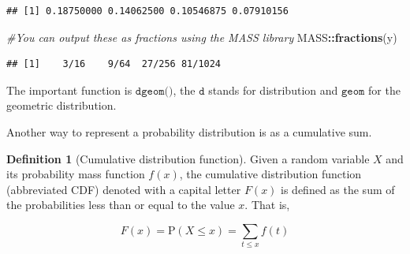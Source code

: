 \documentclass[
]{book}
\newenvironment{Shaded}{\begin{snugshade}}{\end{snugshade}}
\newcommand{\CommentTok}[1]{\textcolor[rgb]{0.56,0.35,0.01}{\textit{#1}}}
\newcommand{\KeywordTok}[1]{\textcolor[rgb]{0.13,0.29,0.53}{\textbf{#1}}}
\newcommand{\NormalTok}[1]{#1}
\newcommand{\OperatorTok}[1]{\textcolor[rgb]{0.81,0.36,0.00}{\textbf{#1}}}
\theoremstyle{definition}
\newtheorem{definition}{Definition}[chapter]
\theoremstyle{definition}
\theoremstyle{definition}
\theoremstyle{definition}
\theoremstyle{remark}
\begin{document}
\begin{verbatim}
## [1] 0.18750000 0.14062500 0.10546875 0.07910156
\end{verbatim}

\begin{Shaded}
\begin{Highlighting}[]
\CommentTok{#You can output these as fractions using the MASS library}
\NormalTok{MASS}\OperatorTok{::}\KeywordTok{fractions}\NormalTok{(y)}
\end{Highlighting}
\end{Shaded}

\begin{verbatim}
## [1]    3/16    9/64  27/256 81/1024
\end{verbatim}

The important function is \(\texttt{dgeom()}\), the \(\texttt{d}\) stands for distribution and \(\texttt{geom}\) for the geometric distribution.

Another way to represent a probability distribution is as a cumulative sum.

\begin{definition}[Cumulative distribution function]
Given a random variable \(X\) and its probability mass function \(f(x)\), the cumulative distribution function (abbreviated CDF) denoted with a capital letter \(F(x)\) is defined as the sum of the probabilities less than or equal to the value \(x\). That is,

\[ F(x) = \text{P}(X\leq x) = \sum_{t\leq x}f(t)\]
\end{definition}
\end{document}
